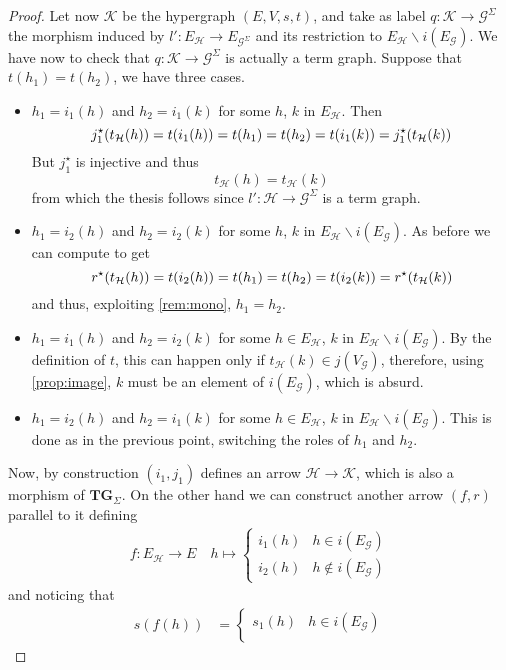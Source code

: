 \documentclass[runningheads,envcountsect]{lmcs}
\newcommand{\catname}[1]{\mathbf{#1}}
\newcommand{\tg}[0]{\catname{TG}_{\Sigma}}
\theoremstyle{plain}
\theoremstyle{definition}
\begin{document}
\begin{proof}
	Let now $\mathcal{K}$ be the hypergraph $(E, V, s, t)$, and take as label $q:\mathcal{K}\to \mathcal{G}^{\Sigma}$ the morphism induced by $l':E_{\mathcal{H}}\to E_{\mathcal{G}^{\Sigma}}$ and its restriction to $E_{\mathcal{H}}\smallsetminus i(E_{\mathcal{G}})$.	We have now to check that  $q:\mathcal{K}\to \mathcal{G}^{\Sigma}$ is actually a term graph. Suppose that $t(h_1)=t(h_2)$, we have three cases.
	\begin{itemize}
		\item $h_1=i_1(h)$ and $h_2=i_1(k)$ for some $h$, $k$ in $E_{\mathcal{H}}$. Then \[j^{\star}_{1}\qty(t_{\mathcal{H}}(h))=t(i_1(h))=t(h_1)=t(h_2)=t(i_1(k))=j^{\star}_{1}\qty(t_{\mathcal{H}}(k))\] 
		But $j^\star_1$ is injective and thus
		\[t_{\mathcal{H}}(h)=t_{\mathcal{H}}(k)\]
		from which the thesis follows since $l':\mathcal{H}\to \mathcal{G}^{\Sigma}$ is a term graph.
		\item $h_1=i_2(h)$ and $h_2=i_2(k)$ for some $h$, $k$ in $E_{\mathcal{H}}\smallsetminus i(E_{\mathcal{G}})$. As before we can compute to get \[r^\star\qty(t_{\mathcal{H}}(h))=t(i_2(h))=t(h_1)=t(h_2)=t(i_2(k))=r^\star\qty(t_{\mathcal{H}}(k))\] 
		and thus, exploiting \cref{rem:mono}, $h_1=h_2$.
		\item $h_1=i_1(h)$ and $h_2=i_2(k)$ for some $h\in E_{\mathcal{H}}$, $k$ in $E_{\mathcal{H}}\smallsetminus i(E_{\mathcal{G}})$. By the definition of $t$, this can happen only if $t_{\mathcal{H}}(k)\in j(V_{\mathcal{G}})$, therefore, using \cref{prop:image}, $k$ must be an element of $i(E_{\mathcal{G}})$, which is absurd.
		\item $h_1=i_2(h)$ and $h_2=i_1(k)$ for some $h\in E_{\mathcal{H}}$, $k$ in $E_{\mathcal{H}}\smallsetminus i(E_{\mathcal{G}})$. This is done as in the previous point, switching the roles of $h_1$ and $h_2$.
	\end{itemize}
	Now, by construction $(i_1, j_1)$ defines an arrow $\mathcal{H}\to \mathcal{K}$, which is also a morphism of $\tg$. On the other hand we can construct another arrow $(f,r)$ parallel to it defining
	\begin{align*}
	f:E_{\mathcal{H}}\to E \quad h \mapsto
	\begin{cases}
	i_1(h) &h\in i(E_{\mathcal{G}})\\
	i_2(h) &h\notin i(E_{\mathcal{G}})
	\end{cases}
	\end{align*}
	and noticing that 
	\begin{align*}s(f(h))&=\begin{cases}
	s_1(h)&h\in i(E_{\mathcal{G}})\\

\end{cases}
\end{align*}
\end{proof}
\end{document}
